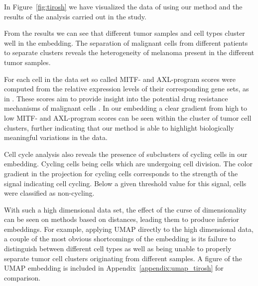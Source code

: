 In Figure~\ref{fig:tirosh} we have visualized the data of \cite{tirosh} using our method and the results of the analysis carried out in the study.

From the results we can see that different tumor samples and cell types cluster well in the embedding. The separation of malignant cells from different patients to separate clusters reveals the heterogeneity of melanoma present in the different tumor samples.

For each cell in the data set so called MITF- and AXL-program scores were computed from the relative expression levels of their corresponding gene sets, as in \cite{tirosh}. These scores aim to provide insight into the potential drug resistance mechanisms of malignant cells \cite{mitf, mitf_axl}. In our embedding a clear gradient from high to low MITF- and AXL-program scores can be seen within the cluster of tumor cell clusters, further indicating that our method is able to highlight biologically meaningful variations in the data.

Cell cycle analysis also reveals the presence of subclusters of cycling cells in our embedding. Cycling cells being cells which are undergoing cell division. The color gradient in the projection for cycling cells corresponds to the strength of the signal indicating cell cycling. Below a given threshold value for this signal, cells were classified as non-cycling.

With such a high dimensional data set, the effect of the curse of dimensionality can be seen on methods based on distances, leading them to produce inferior embeddings. For example, applying UMAP directly to the high dimensional data, a couple of the most obvious shortcomings of the embedding is its failure to distinguish between different cell types as well as being unable to properly separate tumor cell clusters originating from different samples. A figure of the UMAP embedding is included in Appendix~\ref{appendix:umap_tirosh} for comparison.

